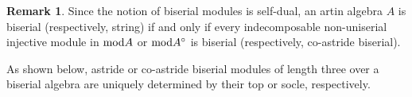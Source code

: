\documentclass[10pt]{amsart}
\newtheorem{Lemma}[Theo]{Lemma}
\theoremstyle{definition}
\newtheorem{Remark}[Theo]{Remark}
\newcommand{\mmod}{{\rm mod}}
\newcommand{\rad}{{\rm rad}\hspace{.5pt}}
\newcommand{\soc}{{\rm soc}\hspace{.5pt}}
\newcommand{\ntop}{{\rm top}\hspace{.5pt}}
\begin{document}
\begin{Remark} 

Since the notion of biserial modules is self-dual, an artin algebra $A$ is biserial (respectively, string) if and only if every indecomposable non-uniserial injective module in $\mmod A$ or $\mmod A^\circ$ is biserial (respectively, co-astride biserial).
    
\end{Remark}




As shown below, astride or co-astride biserial modules of length three over a biserial algebra are uniquely determined by their top or socle, respectively.
\end{document}
